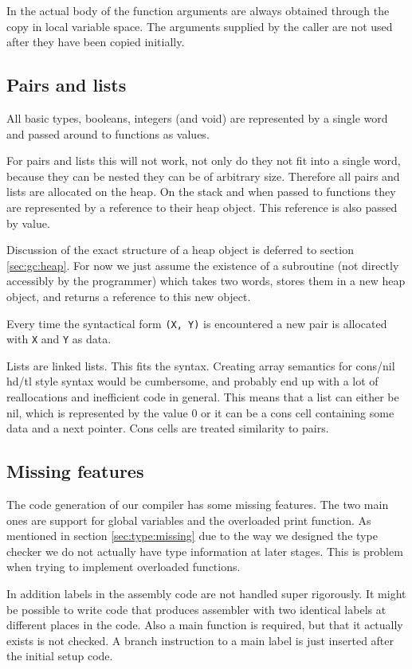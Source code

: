 \documentclass{scrartcl}
\begin{document}
In the actual body of the function arguments are always obtained
through the copy in local variable space. The arguments supplied by
the caller are not used after they have been copied initially.

\subsection{Pairs and lists}

All basic types, booleans, integers (and void)  are represented by a
single word and passed around to functions as values.

For pairs and lists this will not work, not only do they not fit into
a single word, because they can be nested they can be of arbitrary 
size. Therefore all pairs and lists are allocated on the heap. On
the stack and when passed to functions they are represented by a
reference to their heap object. This reference is also passed by value.

Discussion of the exact structure of a heap object is deferred to
section \ref{sec:gc:heap}. For now we just assume the existence of 
a subroutine (not directly accessibly by the programmer) which takes
two words, stores them in a new heap object, and returns a reference
to this new object.

Every time the syntactical form \lstinline{(X, Y)} is encountered a
new pair is allocated with \lstinline{X} and \lstinline{Y} as data.

Lists are linked lists. This fits the syntax. Creating array semantics
for cons/nil hd/tl style syntax would be cumbersome, and probably end
up with a lot of reallocations and inefficient code in general. This
means that a list can either be nil, which is represented by the value
0 or it can be a cons cell containing some data and a next pointer.
Cons cells are treated similarity to pairs.

\subsection{Missing features}

The code generation of our compiler has some missing features. The
two main ones are support for global variables and the overloaded print
function. As mentioned in section \ref{sec:type:missing} due to the
way we designed the type checker we do not actually have type information
at later stages. This is problem when trying to implement overloaded
functions.

In addition labels in the assembly code are not handled super rigorously.
It might be possible to write code that produces assembler with two
identical labels at different places in the code. Also a main function
is required, but that it actually exists is not checked. A branch
instruction to a main label is just inserted after the initial setup
code.
\end{document}
